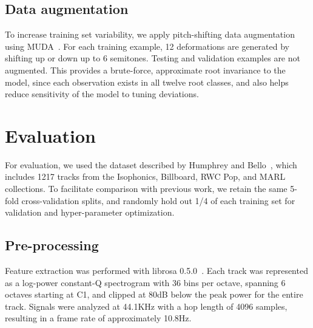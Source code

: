 \documentclass{article}
\begin{document}

%       

\subsection{Data augmentation}

To increase training set variability, we apply pitch-shifting data augmentation using MUDA~\cite{mcfee2015software}.
For each training example, 12 deformations are generated by shifting up or down up to 6 semitones.
Testing and validation examples are not augmented.
This provides a brute-force, approximate root invariance to the model, since each observation exists in all twelve root classes, and also helps reduce sensitivity of the model to tuning deviations.


\section{Evaluation}

For evaluation, we used the dataset described by Humphrey and Bello~\cite{humphrey2015four}, which includes 1217 tracks from the Isophonics, Billboard, RWC Pop, and MARL collections.
To facilitate comparison with previous work, we retain the same 5-fold cross-validation splits, and randomly hold out 1/4 of each training set for validation and hyper-parameter optimization.

\subsection{Pre-processing}

Feature extraction was performed with librosa 0.5.0~\cite{librosa050}.
Each track was represented as a log-power constant-Q spectrogram with 36 bins per octave, spanning 6 octaves starting at C1, and clipped at 80dB below the peak power for the entire track.
Signals were analyzed at 44.1KHz with a hop length of 4096 samples, resulting in a frame rate of approximately 10.8Hz.
\end{document}
